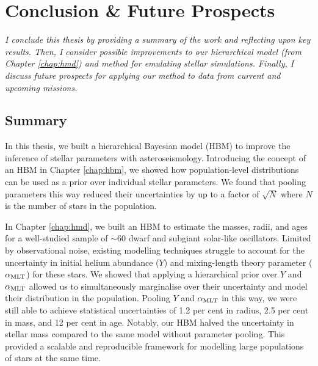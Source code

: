 %
%
%
%
%
\chapter{Conclusion \& Future Prospects}

\textit{I conclude this thesis by providing a summary of the work and reflecting upon key results. Then, I consider possible improvements to our hierarchical model (from Chapter \ref{chap:hmd}) and method for emulating stellar simulations. Finally, I discuss future prospects for applying our method to data from current and upcoming missions.}

\section*{Summary}

In this thesis, we built a hierarchical Bayesian model (HBM) to improve the inference of stellar parameters with asteroseismology. Introducing the concept of an HBM in Chapter \ref{chap:hbm}, we showed how population-level distributions can be used as a prior over individual stellar parameters. We found that pooling parameters this way reduced their uncertainties by up to a factor of \(\sqrt{N}\) where \(N\) is the number of stars in the population.

In Chapter \ref{chap:hmd}, we built an HBM to estimate the masses, radii, and ages for a well-studied sample of \(\sim 60\) dwarf and subgiant solar-like oscillators. Limited by observational noise, existing modelling techniques struggle to account for the uncertainty in initial helium abundance (\(Y\)) and mixing-length theory parameter (\({\alpha_\mathrm{MLT}}\)) for these stars. We showed that applying a hierarchical prior over \(Y\) and \({\alpha_\mathrm{MLT}}\) allowed us to simultaneously marginalise over their uncertainty and model their distribution in the population. Pooling \(Y\) and \({\alpha_\mathrm{MLT}}\) in this way, we were still able to achieve statistical uncertainties of 1.2 per cent in radius, 2.5 per cent in mass, and 12 per cent in age. Notably, our HBM halved the uncertainty in stellar mass compared to the same model without parameter pooling. This provided a scalable and reproducible framework for modelling large populations of stars at the same time.

